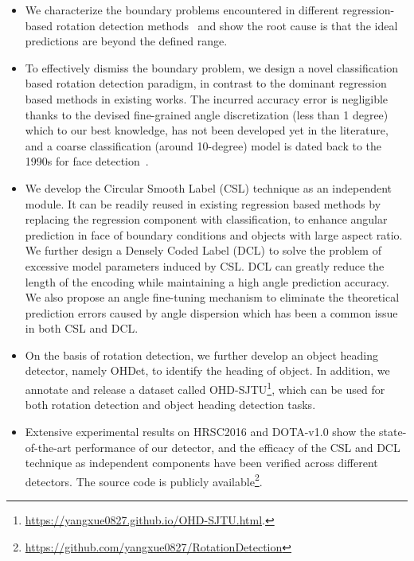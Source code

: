 \documentclass[10pt,journal,compsoc]{IEEEtran}
\begin{document}
\begin{itemize}
    \item We characterize the boundary problems encountered in different regression-based rotation detection methods~\cite{azimi2018towards, yang2018automatic, yang2021r3det, ding2018learning} and show the root cause is that the ideal predictions are beyond the defined range. 

    \item To effectively dismiss the boundary problem, we design a novel classification based rotation detection paradigm, in contrast to the dominant regression based methods in existing works. The incurred accuracy error is negligible thanks to the devised fine-grained angle discretization (less than 1 degree) which to our best knowledge, has not been developed yet in the literature, and a coarse classification (around 10-degree) model is dated back to the 1990s for face detection~\cite{rowley1998rotation}.
    
    \item We develop the Circular Smooth Label (CSL) technique as an independent module. It can be readily reused in existing regression based methods by replacing the regression component with classification, to enhance angular prediction in face of boundary conditions and objects with large aspect ratio. We further design a Densely Coded Label (DCL) to solve the problem of excessive model parameters induced by CSL. DCL can greatly reduce the length of the encoding while maintaining a high angle prediction accuracy. We also propose an angle fine-tuning mechanism to eliminate the theoretical prediction errors caused by angle dispersion which has been a common issue in both CSL and DCL.
    
    \item On the basis of rotation detection, we further develop an object heading detector, namely OHDet, to identify the heading of object. In addition, we annotate and release a dataset called OHD-SJTU\footnote{\url{https://yangxue0827.github.io/OHD-SJTU.html}.}, which can be used for both rotation detection and object heading detection tasks.
		
	\item Extensive experimental results on HRSC2016 and DOTA-v1.0 show the state-of-the-art performance of our detector, and the efficacy of the CSL and DCL technique as independent components have been verified across different detectors. The source code \cite{yang2021alpharotate} is publicly available\footnote{\url{https://github.com/yangxue0827/RotationDetection}}. 
\end{itemize}
\end{document}
